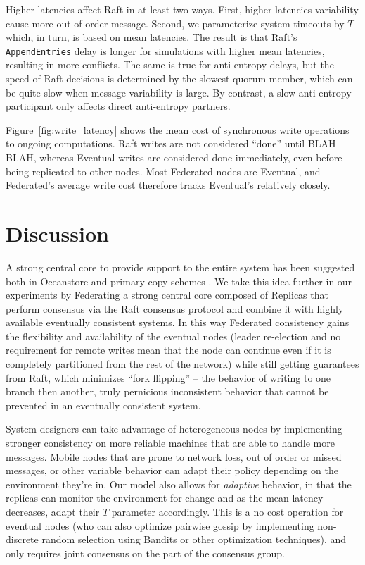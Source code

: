 \documentclass[10pt,conference,letterpaper]{IEEEtran}
\begin{document}
Higher latencies affect Raft in at least two ways. First, higher latencies
variability cause more out of order message. Second, we parameterize system
timeouts by $T$ which, in turn, is based on mean latencies.
The result is that Raft's \texttt{AppendEntries} delay is longer for
simulations with higher mean latencies, resulting in more conflicts.
The same is true for anti-entropy delays, but the speed of Raft decisions is
determined by the slowest quorum member, which can be quite slow when message
variability is large. By contrast, a slow anti-entropy participant only
affects direct anti-entropy partners.

Figure~\ref{fig:write_latency} shows the mean cost of synchronous write operations to
ongoing computations. Raft writes are not considered ``done'' until BLAH BLAH,
whereas Eventual writes are considered done immediately, even before being
replicated to other nodes.
Most Federated nodes are Eventual, and Federated's average write cost
therefore tracks Eventual's relatively closely.

\section{Discussion}

A strong central core to provide support to the entire system has been suggested both in Oceanstore \cite{kubiatowicz_oceanstore:_2000} and primary copy schemes \cite{gray_dangers_1996}. We take this idea further in our experiments by Federating a strong central core composed of Replicas that perform consensus via the Raft consensus protocol and combine it with highly available eventually consistent systems. In this way Federated consistency gains the flexibility and availability of the eventual nodes (leader re-election and no requirement for remote writes mean that the node can continue even if it is completely partitioned from the rest of the network) while still getting guarantees from Raft, which minimizes ``fork flipping'' -- the behavior of writing to one branch then another, truly pernicious inconsistent behavior that cannot be prevented in an eventually consistent system.

System designers can take advantage of heterogeneous nodes by implementing stronger consistency on more reliable machines that are able to handle more messages. Mobile nodes that are prone to network loss, out of order or missed messages, or other variable behavior can adapt their policy depending on the environment they're in. Our model also allows for \textit{adaptive} behavior, in that the replicas can monitor the environment for change and as the mean latency decreases, adapt their $T$ parameter accordingly. This is a no cost operation for eventual nodes (who can also optimize pairwise gossip by implementing non-discrete random selection using Bandits or other optimization techniques), and only requires joint consensus on the part of the consensus group.
\end{document}
